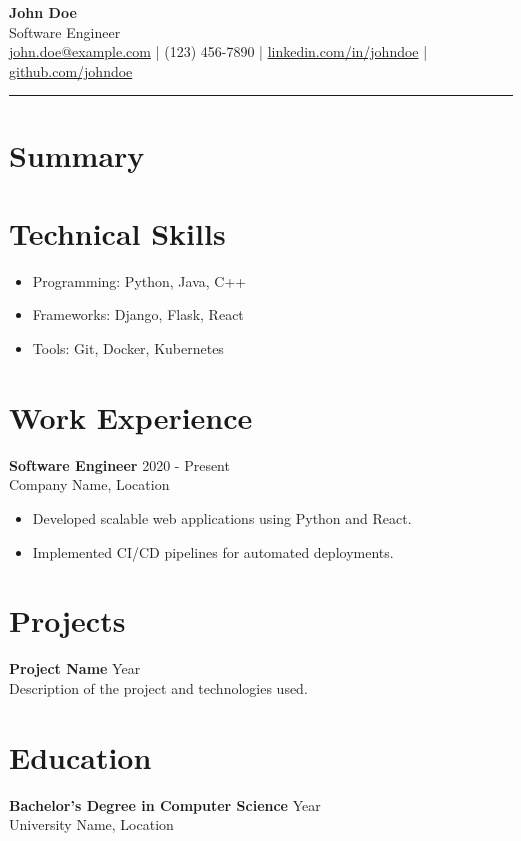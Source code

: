\documentclass[a4paper,10pt]{article}
\begin{document}
\begin{center}
    {\Huge \textbf{John Doe}}\\
    {\large Software Engineer}\\
    \href{mailto:john.doe@example.com}{john.doe@example.com} | (123) 456-7890 | \href{https://linkedin.com/in/johndoe}{linkedin.com/in/johndoe} | \href{https://github.com/johndoe}{github.com/johndoe}
\end{center}

\hrule

\section*{Summary}

\section*{Technical Skills}
\begin{itemize}
    \item Programming: Python, Java, C++
    \item Frameworks: Django, Flask, React
    \item Tools: Git, Docker, Kubernetes
\end{itemize}

\section*{Work Experience}
\textbf{Software Engineer} \hfill 2020 - Present\\
Company Name, Location\\
\begin{itemize}
    \item Developed scalable web applications using Python and React.
    \item Implemented CI/CD pipelines for automated deployments.
\end{itemize}

\section*{Projects}
\textbf{Project Name} \hfill Year\\
Description of the project and technologies used.

\section*{Education}
\textbf{Bachelor's Degree in Computer Science} \hfill Year\\
University Name, Location
\end{document}
